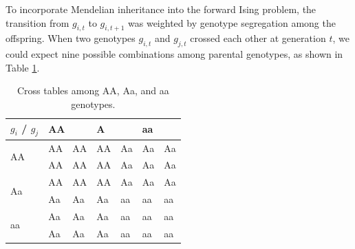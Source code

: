 \documentclass[12pt,]{article}
\begin{document}
To incorporate Mendelian inheritance into the forward Ising problem, the transition from $g_{i,t}$ to $g_{i,t+1}$ was weighted by genotype segregation among the offspring. When two genotypes $g_{i,t}$ and $g_{j,t}$ crossed each other at generation $t$, we could expect nine possible combinations among parental genotypes, as shown in Table \ref{tableS1:MCMCinherit}.

\begin{table}
\centering
\caption{Cross tables among AA, Aa, and aa genotypes.}
\begin{tabular}{|l|ll|ll|ll|}
\hline
$g_i$ / $g_j$             & \multicolumn{2}{l|}{AA} & \multicolumn{2}{l|}{ A } & \multicolumn{2}{l|}{aa} \\ \hline
\multirow{2}{*}{AA} & AA         & AA         & AA         & Aa         & Aa         & Aa         \\
                    & AA         & AA         & AA         & Aa         & Aa         & Aa         \\ \hline
\multirow{2}{*}{Aa} & AA         & AA         & AA         & Aa         & Aa         & Aa         \\
                    & Aa         & Aa         & Aa         & aa         & aa         & aa         \\ \hline
\multirow{2}{*}{aa} & Aa         & Aa         & Aa         & aa         & aa         & aa         \\
                    & Aa         & Aa         & Aa         & aa         & aa         & aa         \\ \hline
\end{tabular}
  \label{tableS1:MCMCinherit}
\end{table}
\end{document}
